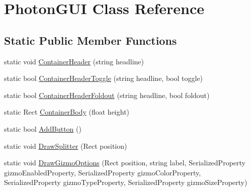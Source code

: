 \hypertarget{class_photon_g_u_i}{}\section{Photon\+G\+UI Class Reference}
\label{class_photon_g_u_i}
\subsection*{Static Public Member Functions}
\begin{DoxyCompactItemize}
\item 
static void \hyperlink{class_photon_g_u_i_aadea221ddac8eb43d724175da7f4553c}{Container\+Header} (string headline)
\item 
static bool \hyperlink{class_photon_g_u_i_aa69826ffe56e2ea427b664619203a672}{Container\+Header\+Toggle} (string headline, bool toggle)
\item 
static bool \hyperlink{class_photon_g_u_i_a3b63ed2db12ad8fb010e3ae351b3a113}{Container\+Header\+Foldout} (string headline, bool foldout)
\item 
static Rect \hyperlink{class_photon_g_u_i_a000cf29f3883925576cc7dd90a3ce777}{Container\+Body} (float height)
\item 
static bool \hyperlink{class_photon_g_u_i_a40f7c12e66ef8cf52f4c74e0d5ec9544}{Add\+Button} ()
\item 
static void \hyperlink{class_photon_g_u_i_aac5f1084d59d892082792940ccb6bb51}{Draw\+Splitter} (Rect position)
\item 
static void \hyperlink{class_photon_g_u_i_a12f480b69a7e841cd7df18cfd7502b9c}{Draw\+Gizmo\+Options} (Rect position, string label, Serialized\+Property gizmo\+Enabled\+Property, Serialized\+Property gizmo\+Color\+Property, Serialized\+Property gizmo\+Type\+Property, Serialized\+Property gizmo\+Size\+Property)
\end{DoxyCompactItemize}

